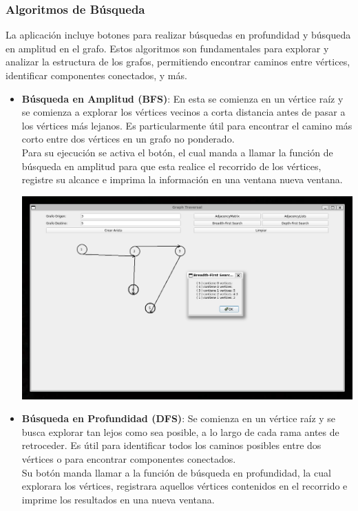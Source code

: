 \documentclass[conference]{IEEEtran}
\begin{document}
\subsubsection{\textbf{Algoritmos de Búsqueda}}
La aplicación incluye botones para realizar búsquedas en profundidad y búsqueda en amplitud en el grafo. Estos algoritmos son fundamentales para explorar y analizar la estructura de los grafos, permitiendo encontrar caminos entre vértices, identificar componentes conectados, y más.
\begin{itemize}
    \item \textbf{Búsqueda en Amplitud (BFS)}: En esta se comienza en un vértice raíz y se comienza a explorar los vértices vecinos a corta distancia antes de pasar a los vértices más lejanos. Es particularmente útil para encontrar el camino más corto entre dos vértices en un grafo no ponderado.\\
    Para su ejecución se activa el botón, el cual manda a llamar la función de búsqueda en amplitud para que esta realice el recorrido de los vértices, registre su alcance e imprima la información en una ventana nueva ventana.
        \begin{center}
            \includegraphics[width=\linewidth]{img/BFS.png}
        \end{center}
    \item \textbf{Búsqueda en Profundidad (DFS)}: Se comienza en un vértice raíz y se busca explorar tan lejos como sea posible, a lo largo de cada rama antes de retroceder. Es útil para identificar todos los caminos posibles entre dos vértices o para encontrar componentes conectados.\\
    Su botón manda llamar a la función de búsqueda en profundidad, la cual explorara los vértices, registrara aquellos vértices contenidos en el recorrido e imprime los resultados en una nueva ventana.

\end{itemize}
\end{document}

